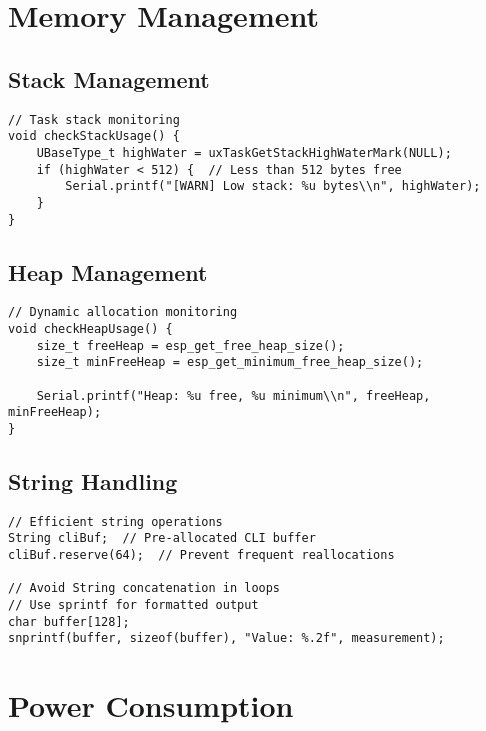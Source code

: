 \documentclass[11pt,a4paper]{article}
\begin{document}
\section{Memory Management}

\subsection{Stack Management}

\begin{lstlisting}[caption=Stack Usage Monitoring]
// Task stack monitoring
void checkStackUsage() {
    UBaseType_t highWater = uxTaskGetStackHighWaterMark(NULL);
    if (highWater < 512) {  // Less than 512 bytes free
        Serial.printf("[WARN] Low stack: %u bytes\\n", highWater);
    }
}
\end{lstlisting}

\subsection{Heap Management}

\begin{lstlisting}[caption=Heap Usage Monitoring]
// Dynamic allocation monitoring
void checkHeapUsage() {
    size_t freeHeap = esp_get_free_heap_size();
    size_t minFreeHeap = esp_get_minimum_free_heap_size();
    
    Serial.printf("Heap: %u free, %u minimum\\n", freeHeap, minFreeHeap);
}
\end{lstlisting}

\subsection{String Handling}

\begin{lstlisting}[caption=Efficient String Handling]
// Efficient string operations
String cliBuf;  // Pre-allocated CLI buffer
cliBuf.reserve(64);  // Prevent frequent reallocations

// Avoid String concatenation in loops
// Use sprintf for formatted output
char buffer[128];
snprintf(buffer, sizeof(buffer), "Value: %.2f", measurement);
\end{lstlisting}

\section{Power Consumption}
\end{document}
